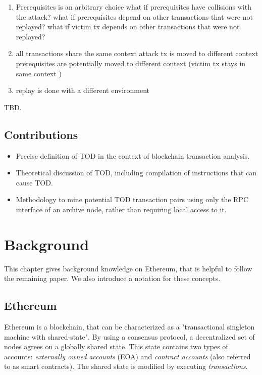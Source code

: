 \documentclass[draft,final]{vutinfth} %
\begin{document}
    \begin{enumerate}
        \item Prerequisites is an arbitrary choice
              \subitem what if prerequisites have collisions with the attack?
              \subitem what if prerequisites depend on other transactions that were not replayed?
              \subitem what if victim tx depends on other transactions that were not replayed?
        \item all transactions share the same context
              \subitem attack tx is moved to different context
              \subitem prerequisites are potentially moved to different context
              \subitem (victim tx stays in same context \checkmark)
        \item replay is done with a different environment
    \end{enumerate}
\fi

TBD.

\section{Contributions}


\begin{itemize}
    \item Precise definition of TOD in the context of blockchain transaction analysis.
    \item Theoretical discussion of TOD, including compilation of instructions that can cause TOD.
    \item Methodology to mine potential TOD transaction pairs using only the RPC interface of an archive node, rather than requiring local access to it.
\end{itemize}

\chapter{Background}

This chapter gives background knowledge on Ethereum, that is helpful to follow the remaining paper. We also introduce a notation for these concepts.

\section{Ethereum}

Ethereum is a blockchain, that can be characterized as a "transactional singleton machine with shared-state". \cite[p.1]{wood_ethereum_2024} By using a consensus protocol, a decentralized set of nodes agrees on a globally shared state. This state contains two types of accounts: \emph{externally owned accounts} (EOA) and \emph{contract accounts} (also referred to as smart contracts). The shared state is modified by executing \emph{transactions}. \cite{tikhomirov_ethereum_2018}
\end{document}

